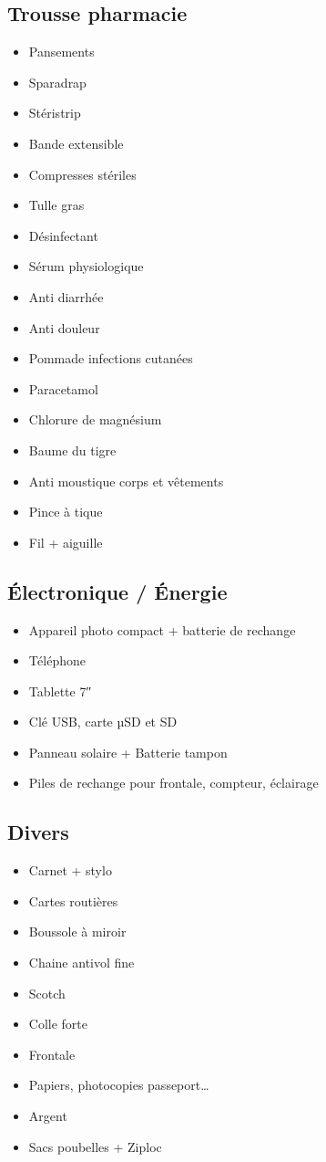   \subsection*{Trousse pharmacie}
 \begin{itemize}
 \item Pansements
 \item Sparadrap
 \item Stéristrip
 \item Bande extensible
 \item Compresses stériles
 \item Tulle gras
 \item Désinfectant
 \item Sérum physiologique
 \item Anti diarrhée
 \item Anti douleur
 \item Pommade infections cutanées
 \item Paracetamol
 \item Chlorure de magnésium
 \item Baume du tigre
 \item Anti moustique corps et vêtements
 \item Pince à tique
 \item Fil + aiguille
 \end{itemize}
 
  \subsection*{Électronique / Énergie}
 \begin{itemize}
 \item Appareil photo compact + batterie de rechange
 \item Téléphone
 \item Tablette 7″
 \item Clé USB, carte µSD et SD
 \item Panneau solaire + Batterie tampon
 \item Piles de rechange pour frontale, compteur, éclairage
 \end{itemize}
 
  \subsection*{Divers}
 \begin{itemize}
 \item Carnet + stylo
 \item Cartes routières
 \item Boussole à miroir
 \item Chaine antivol fine
 \item Scotch
 \item Colle forte
 \item Frontale
 \item Papiers, photocopies passeport…
 \item Argent
 \item Sacs poubelles + Ziploc
 \end{itemize}
